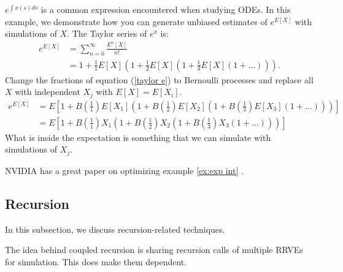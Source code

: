 \documentclass[a4paper,12pt]{article}
\begin{document}
\begin{example}[$e^{E[X]}$] \label{ex:exp int}
    $e^{\int x(s)ds}$ is a common expression encountered when studying ODEs.
    In this example, we demonstrate how you can generate unbiased estimates of
    $e^{E[X]}$ with simulations of $X$. The Taylor series of $e^{x}$ is:
    \begin{align}
        e^{E[X]} & = \sum_{n=0}^{\infty} \frac{E^{n}[X]}{n!}     \\
                 & = 1 + \frac{1}{1}E[X]\left(1+ \frac{1}{2}E[X]
        \left(1+\frac{1}{3}E[X]\left(1+ ...\right)\right)\right). \label{taylor e}
    \end{align}
    Change the fractions of equation (\ref{taylor e}) to Bernoulli processes
    and replace all $X$ with independent $X_j$ with $E[X]=E[X_{i}]$.
    \begin{align}
        e^{E[X]} & = E
        \left[1 + B\left(\frac{1}{1}\right)E[X_1]
        \left(1+ B\left(\frac{1}{2}\right)E[X_2]
        \left(1+B\left(\frac{1}{3}\right)E[X_3]
        \left(1+ ...\right)
        \right)
        \right)
        \right]              \\
                 & = E\left[
            1 + B\left(\frac{1}{1}\right)X_1
            \left(1+ B\left(\frac{1}{2}\right)X_2
            \left(1+B\left(\frac{1}{3}\right)X_3
            \left(1+ ...\right)
            \right)
            \right)
            \right]
    \end{align}
    What is inside the expectation is something that we can simulate with simulations of $X_{j}$.
\end{example}

\begin{related}
    NVIDIA has a great paper on optimizing example \ref{ex:exp int}
    \cite{kettunen_unbiased_2021}.
\end{related}

\subsection{Recursion}

In this subsection, we discuss recursion-related techniques.

\begin{technique}
    The idea behind coupled recursion is sharing recursion calls of
    multiple RRVEs for simulation. This does make them dependent.
\end{technique}
\end{document}
